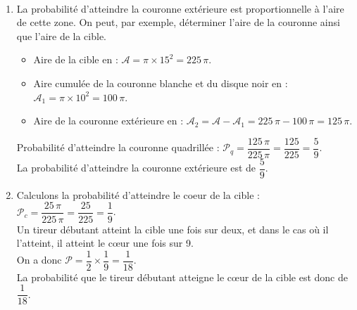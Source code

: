 \ \\ [-5mm]
   \begin{enumerate}
      \item La probabilité d'atteindre la couronne extérieure est proportionnelle à l'aire de cette zone. On peut, par exemple, déterminer l'aire de la couronne ainsi que l'aire de la cible.
         \begin{itemize}
            \item Aire de la cible en \ucmq{} : $\mathcal{A} =\pi\times15^2 =225\,\pi$.
            \item Aire cumulée de la couronne blanche et du disque noir en \ucmq{} : $\mathcal{A}_1 =\pi\times10^2 =100\,\pi$.
            \item Aire de la couronne extérieure en \ucmq{} : $\mathcal{A}_2 =\mathcal{A} -\mathcal{A}_1 =225\,\pi-100\,\pi =125\,\pi$. \smallskip
         \end{itemize}
         Probabilité d'atteindre la couronne quadrillée : $\mathcal{P}_q =\dfrac{125\,\pi}{225\,\pi} =\dfrac{125}{225} =\dfrac59$. \\ [1mm]
         {\blue La probabilité d'atteindre la couronne extérieure est de $\dfrac59$.}
      \item Calculons la probabilité d'atteindre le coeur de la cible : $\mathcal{P}_c =\dfrac{25\,\pi}{225\,\pi} =\dfrac{25}{225} =\dfrac19$. \\ [1.5mm]
         Un tireur débutant atteint la cible une fois sur deux, et dans le cas où il l'atteint, il atteint le c\oe ur une fois sur 9. \\ [1mm]
         On a donc $\mathcal{P} =\dfrac12\times\dfrac19 =\dfrac{1}{18}$. \\
         {\blue La probabilité que le tireur débutant atteigne le c\oe ur de la cible est donc de $\dfrac{1}{18}$.}
   \end{enumerate}
